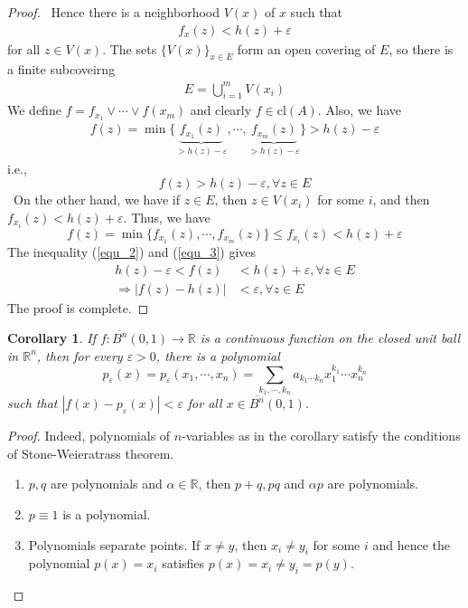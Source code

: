 \documentclass[12pt,leqno]{amsart}
\newtheorem{corollary}{Corollary}[theorem]
\theoremstyle{definition}
\numberwithin{equation}{subsection}
\begin{document}
\begin{proof}
\hspace*{1em}\, Hence there is a neighborhood $V(x)$ of $x$ such that 
\begin{align*}
    f_x(z) < h(z) + \varepsilon
\end{align*}
for all $z\in V(x)$. The sets $\{V(x)\}_{x\in E}$ form an open covering of $E$, so there is a finite subcoveirng 
\begin{align*}
    E = \bigcup^m_{i=1}V(x_i)
\end{align*}
We define $f = f_{x_1}\vee\cdots\vee f(x_m)$ and clearly $f\in \text{cl}(A)$. Also, we have 
\begin{align*}
    f(z) = \min\{\underbrace{f_{x_1}(z)}_{>h(z)-\varepsilon}, \cdots, \underbrace{f_{x_m}(z)}_{>h(z)-\varepsilon}\} > h(z) - \varepsilon
\end{align*}
i.e.,  
\begin{equation}\label{equ_2}
    f(z) > h(z) -\varepsilon, \forall z\in E
\end{equation}
\hspace*{1em}\, On the other hand, we have if $z\in E$, then $z\in V(x_i)$ for some $i$, and then $f_{x_i}(z) < h(z) + \varepsilon$. Thus, we have 
\begin{equation}\label{equ_3}
    f(z) = \min\{f_{x_1}(z), \cdots,f_{x_m}(z)\} \leq f_{x_i}(z) < h(z) + \varepsilon
\end{equation}
The inequality (\ref{equ_2}) and (\ref{equ_3}) gives 
\begin{align*}
    h(z) - \varepsilon < f(z) & < h(z) + \varepsilon, \forall z\in E \\
    \Rightarrow \left|f(z) - h(z)\right| & < \varepsilon, \forall z\in E
\end{align*}
The proof is complete.
\end{proof}

\begin{corollary}
If $f:\overline{B^n}(0,1)\to\mathbb{R}$ is a continuous function on the closed unit ball in $\mathbb{R}^n$, then for every $\varepsilon > 0$, there is a polynomial $$p_\varepsilon(x) = p_\varepsilon(x_1,\cdots,x_n) = \sum_{k_1,\cdots,k_n}a_{k_1 \cdots k_n}x_1^{k_1}\cdots x_n^{k_n}$$
such that $|f(x) - p_\varepsilon(x)| < \varepsilon$ for all $x\in \overline{B^n}(0,1)$.
\end{corollary}
\begin{proof}
Indeed, polynomials of $n$-variables as in the corollary satisfy the conditions of Stone-Weieratrass theorem.
\begin{enumerate}
    \item $p,q$ are polynomials and $\alpha\in\mathbb{R}$, then $p+q, pq$ and $\alpha p$ are polynomials.
    \item $p\equiv 1$ is a polynomial.
    \item Polynomials separate points. If $x\neq y$, then $x_i\neq y_i$ for some $i$ and hence the polynomial $p(x) = x_i$ satisfies $p(x) = x_i \neq y_i = p(y)$.
\end{enumerate}
\end{proof}
\end{document}
